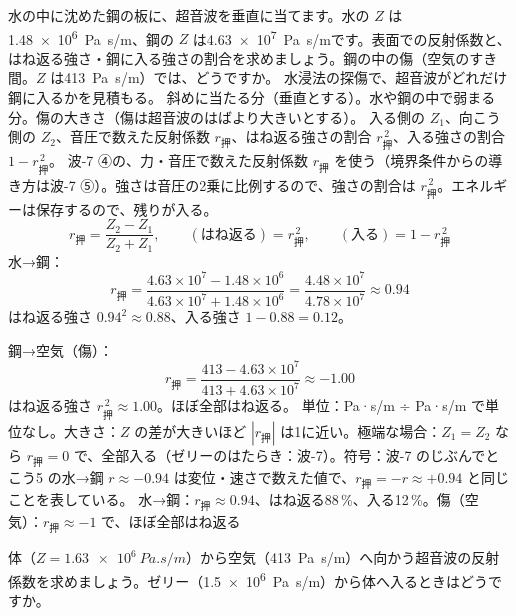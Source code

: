 \begin{phreidai}[水から鋼に入る超音波]
\label{ph:波-10:ex5}水の中に沈めた鋼の板に、超音波を垂直に当てます。水の $Z$ は\qty{1.48e6}{Pa.s/m}、鋼の $Z$ は\qty{4.63e7}{Pa.s/m}です。表面での反射係数と、はね返る強さ・鋼に入る強さの割合を求めましょう。鋼の中の傷（空気のすき間。$Z$ は\qty{413}{Pa.s/m}）では、どうですか。
\phbamen
水浸法の探傷で、超音波がどれだけ鋼に入るかを見積もる。
\phmushi
斜めに当たる分（垂直とする）。水や鋼の中で弱まる分。傷の大きさ（傷は超音波のはばより大きいとする）。
\phzu
入る側の $Z_1$、向こう側の $Z_2$、音圧で数えた反射係数 $r_{\text{押}}$、はね返る強さの割合 $r_{\text{押}}^{\,2}$、入る強さの割合 $1-r_{\text{押}}^{\,2}$。
\phriyu
波-7 ④の、力・音圧で数えた反射係数 $r_{\text{押}}$ を使う（境界条件からの導き方は波-7 ⑤）。強さは音圧の2乗に比例するので、強さの割合は $r_{\text{押}}^{\,2}$。エネルギーは保存するので、残りが入る。
\phtateru
\[ r_{\text{押}}=\frac{Z_2-Z_1}{Z_2+Z_1},\qquad (\text{はね返る})=r_{\text{押}}^{\,2},\qquad (\text{入る})=1-r_{\text{押}}^{\,2} \]
\phtoku
水→鋼：
\[ r_{\text{押}}=\frac{4.63\times10^7-1.48\times10^6}{4.63\times10^7+1.48\times10^6}=\frac{4.48\times10^7}{4.78\times10^7}\approx0.94 \]
はね返る強さ $0.94^2\approx0.88$、入る強さ $1-0.88=0.12$。

鋼→空気（傷）：
\[ r_{\text{押}}=\frac{413-4.63\times10^7}{413+4.63\times10^7}\approx-1.00 \]
はね返る強さ $r_{\text{押}}^{\,2}\approx1.00$。ほぼ全部はね返る。
\phtashikame
単位：Pa·s/m ÷ Pa·s/m で単位なし。大きさ：$Z$ の差が大きいほど $|r_{\text{押}}|$ は1に近い。極端な場合：$Z_1=Z_2$ なら $r_{\text{押}}=0$ で、全部入る（ゼリーのはたらき：波-7）。符号：波-7 のじぶんでとこう5 の水→鋼 $r\approx-0.94$ は変位・速さで数えた値で、$r_{\text{押}}=-r\approx+0.94$ と同じことを表している。
\kotae 水→鋼：$r_{\text{押}}\approx0.94$、はね返る88\,\%、入る12\,\%。傷（空気）：$r_{\text{押}}\approx-1$ で、ほぼ全部はね返る
\end{phreidai}
\begin{jibun}
体（$Z=\qty{1.63e6}{Pa.s/m}$）から空気（\qty{413}{Pa.s/m}）へ向かう超音波の反射係数を求めましょう。ゼリー（\qty{1.5e6}{Pa.s/m}）から体へ入るときはどうですか。
\end{jibun}

